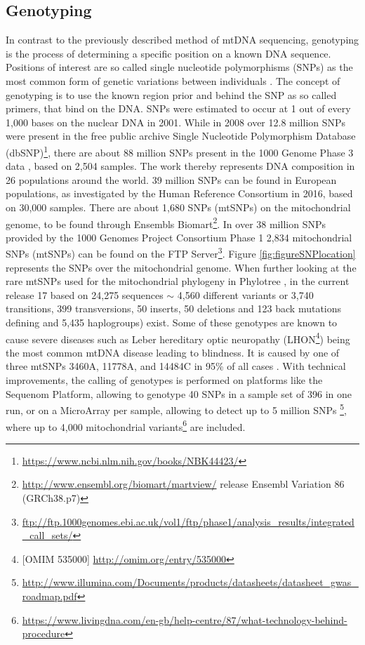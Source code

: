 \subsection{Genotyping}
In contrast to the previously described method of mtDNA sequencing, genotyping is the process of determining a specific position on a known DNA sequence. Positions of interest are so called single nucleotide polymorphisms (SNPs) as the most common form of genetic variations between individuals \cite{Perkel2008,Brandstatter2003}. The concept of genotyping is to use the known region prior and behind the SNP as so called primers, that bind on the DNA. SNPs were estimated to occur at 1 out of every 1,000 bases on the nuclear DNA \cite{Syvanen2001} in 2001. While in 2008 over 12.8 million SNPs were present in the free public archive Single Nucleotide Polymorphism Database (dbSNP)\footnote{\url{https://www.ncbi.nlm.nih.gov/books/NBK44423/}}, there are about 88 million SNPs present in the 1000 Genome Phase 3 data \cite{Auton2015}, based on 2,504 samples. The work thereby represents DNA composition in 26 populations around the world. 39 million SNPs can be found in European populations, as investigated by the Human Reference Consortium \cite{McCarthy2016} in 2016, based on 30,000 samples. There are about 1,680 SNPs (mtSNPs) on the mitochondrial genome, to be found through Ensembls \cite{Flicek2014} Biomart\footnote{\url{http://www.ensembl.org/biomart/martview/} release Ensembl Variation 86 (GRCh38.p7)}. In over 38 million SNPs provided by the 1000 Genomes Project Consortium Phase 1 \cite{Abecasis2012} 2,834 mitochondrial SNPs (mtSNPs) can be found on the FTP Server\footnote{\url{ftp://ftp.1000genomes.ebi.ac.uk/vol1/ftp/phase1/analysis_results/integrated_call_sets/}}. Figure \ref{fig:figureSNPlocation} represents the SNPs over the mitochondrial genome. When further looking at the rare mtSNPs used for the mitochondrial phylogeny in Phylotree \cite{VanOven2009},\cite{VanOven2010} in the current release 17 based on 24,275 sequences $\sim$ 4,560 different variants or 3,740 transitions, 399 transversions, 50 inserts, 50 deletions and 123 back mutations defining and 5,435 haplogroups) exist. Some of these genotypes are known to cause severe diseases such as Leber hereditary optic neuropathy \cite{Taylor2005} (LHON\footnote{[OMIM 535000] \url{http://omim.org/entry/535000}}) being the most common mtDNA disease leading to blindness. It is caused by one of three mtSNPs 3460A, 11778A, and 14484C in 95\% of all cases \cite{Elson2007}. With technical improvements, the calling of genotypes is performed on platforms like the Sequenom Platform, allowing to genotype 40 SNPs in a sample set of 396 in one run\cite{Weissensteiner2013}, or on a MicroArray per sample, allowing to detect up to 5 million SNPs  \footnote{\url{http://www.illumina.com/Documents/products/datasheets/datasheet_gwas_roadmap.pdf}}, where up to 4,000 mitochondrial variants\footnote{\url{https://www.livingdna.com/en-gb/help-centre/87/what-technology-behind-procedure}} are included.

